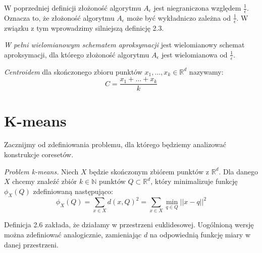 \noindent
W poprzedniej definicji złożoność algorytmu $A_{\epsilon}$ jest niegraniczona względem $\frac{1}{\epsilon}$.
Oznacza to, że złożoność algorytmu $A_{\epsilon}$ może być wykładniczo zależna od $\frac{1}{\epsilon}$.
W związku z tym wprowadzimy silniejszą definicję 2.3.

\begin{definition}
    \emph{W pełni wielomianowym schematem aproksymacji} jest wielomianowy schemat aproksymacji, dla którego złożoność algorytmu $A_{\epsilon}$  jest wielomianowa od $\frac{1}{\epsilon}$.  
\end{definition}


\begin{definition}
    \emph{Centroidem} dla skończonego zbioru punktów $x_{1}, \dots, x_{k} \in \mathbb{R}^{d}$ nazywamy:
    \begin{equation}
        C = \frac{x_{1} + \dots + x_{k}}{k}
    \end{equation}
\end{definition}

\section{K-means}

Zacznijmy od zdefiniowania problemu, dla którego będziemy analizować konstrukcje coresetów.

\begin{definition}
    \emph{Problem k-means.} Niech $X$ będzie skończonym zbiórem punktów z $\mathbb{R}^{d}$. 
    Dla danego $X$ chcemy znaleźć zbiór $k \in \mathbb{N}$ punktów $Q \subset \mathbb{R}^{d}$, który minimalizuje funkcję $\phi_{X}(Q)$ zdefiniowaną następująco:
    \begin{equation}
        \phi_{X}(Q) = \sum_{x \in X} d(x, Q)^{2} = \sum_{x \in X} \min_{q \in Q} || x - q ||^{2} 
    \end{equation}
\end{definition}

\noindent
Definicja 2.6 zakłada, że działamy w przestrzeni euklidesowej.
Uogólnioną wersję można zdefiniować analogicznie, zamieniając $d$ na odpowiednią funkcję miary w danej przestrzeni.

